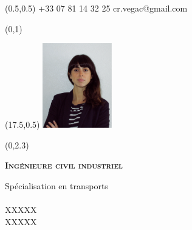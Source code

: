 \documentclass[30pt, french]{tccv}
\begin{document}
\begin{upshape}
\fontsize{9pt}{1em}\color{text}\selectfont



%
%




\begin{textblock}{6.5}(0.5,0.5)
    {+33 07 81 14 32 25}
    {cr.vegac@gmail.com}
\end{textblock}

\begin{textblock}{21}(0,1)
\end{textblock}

\begin{textblock}{21}(17.5,0.5)
		\includegraphics[width=3cm]{../Figure/Rocio3.png}
\end{textblock}  



\begin{textblock}{21}(0,2.3)

\begin{center}
\fontsize{10pt}{1.5em}\color{text}\bodyfontlight\upshape\selectfont

	{\fontsize{14pt}{5em}\scshape\bfseries Ingénieure civil industriel  \\} 

	\vspace{5pt}
Spécialisation en transports 			\\ 		 	\\
XXXXX			\\
XXXXX \\
\end{center}
\end{textblock}  






\end{upshape}
\end{document}
